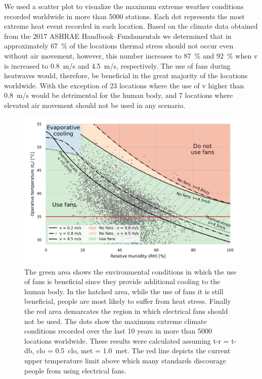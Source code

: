 We used a scatter plot to visualize the maximum extreme weather conditions recorded worldwide in more than 5000 stations.
Each dot represents the most extreme heat event recorded in each location.
Based on the climate data obtained from the 2017 ASHRAE Handbook--Fundamentals we determined that in approximately 67~\% of the locations thermal stress should not occur even without air movement, however, this number increases to 87~\% and 92~\% when \ac{v} is increased to 0.8~m/s and 4.5~m/s, respectively.
The use of fans during heatwaves would, therefore, be beneficial in the great majority of the locations worldwide.
With the exception of 23 locations where the use of \ac{v} higher than 0.8~m/s would be detrimental for the human body, and 7 locations where elevated air movement should not be used in any scenario.



\begin{figure}[thb!]
    \centering
    \includegraphics[width=\textwidth]{figures/use_fans}
    \caption{The green area shows the environmental conditions in which the use of fans is beneficial since they provide additional cooling to the human body.
    In the hatched area, while the use of fans it is still beneficial, people are most likely to suffer from heat stress.
    Finally the red area demarcates the region in which electrical fans should not be used.
    The dots show the maximum extreme climate conditions recorded over the last 10 years in more than 5000 locations worldwide.
     These results were calculated assuming \ac{t-r} = \ac{t-db}, \ac{clo} = 0.5~clo, \ac{met} = 1.0~met.
    The red line depicts the current upper temperature limit above which many standards discourage people from using electrical fans.}
    \label{fig:energy_storage_delta}
\end{figure}

